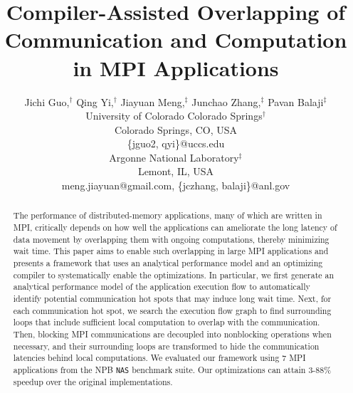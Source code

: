 \documentclass[10pt,doublecolumn,conference]{IEEEtran}
\begin{document}
%
%
\title{Compiler-Assisted Overlapping of Communication and Computation in MPI Applications}

\author{Jichi Guo,$^\dag$ Qing Yi,$^\dag$ Jiayuan Meng,$^\ddag$ Junchao Zhang,$^\ddag$ Pavan Balaji$^\ddag$\\
University of Colorado Colorado Springs$^\dag$\\
Colorado Springs, CO, USA\\
\{jguo2, qyi\}@uccs.edu \\
Argonne National Laboratory$^\ddag$\\
Lemont, IL, USA\\
meng.jiayuan@gmail.com, \{jczhang, balaji\}@anl.gov
}

\maketitle

\begin{abstract}
The performance of distributed-memory applications, many of which are
written in MPI, critically depends on how well the applications can
ameliorate the long latency of data movement by overlapping
them with ongoing computations, thereby minimizing wait time.  This
paper aims to
enable such overlapping in large MPI applications and presents a
framework that uses an analytical performance model and an optimizing compiler
to systematically enable the optimizations.  In particular, we first generate an
analytical performance model of the application execution flow to automatically identify potential communication hot spots
that may induce long wait time.  Next, for each communication hot
spot, we search the execution flow graph to find surrounding loops that
include sufficient local computation to overlap with the
communication.  Then, blocking MPI communications are decoupled into
nonblocking operations when necessary, and their surrounding loops are
transformed to hide the communication latencies behind local
computations.  We evaluated our framework using 7 MPI applications
from the NPB \texttt{NAS} benchmark suite.  Our optimizations can attain
3-88\% speedup over the original implementations.
\end{abstract}


\end{document}
